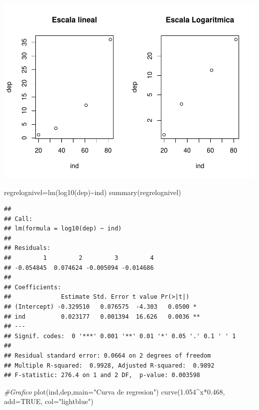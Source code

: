\documentclass[
]{article}
\newenvironment{Shaded}{\begin{snugshade}}{\end{snugshade}}
\newcommand{\AttributeTok}[1]{\textcolor[rgb]{0.77,0.63,0.00}{#1}}
\newcommand{\CommentTok}[1]{\textcolor[rgb]{0.56,0.35,0.01}{\textit{#1}}}
\newcommand{\ConstantTok}[1]{\textcolor[rgb]{0.00,0.00,0.00}{#1}}
\newcommand{\FloatTok}[1]{\textcolor[rgb]{0.00,0.00,0.81}{#1}}
\newcommand{\FunctionTok}[1]{\textcolor[rgb]{0.00,0.00,0.00}{#1}}
\newcommand{\NormalTok}[1]{#1}
\newcommand{\OtherTok}[1]{\textcolor[rgb]{0.56,0.35,0.01}{#1}}
\newcommand{\SpecialCharTok}[1]{\textcolor[rgb]{0.00,0.00,0.00}{#1}}
\newcommand{\StringTok}[1]{\textcolor[rgb]{0.31,0.60,0.02}{#1}}
\begin{document}
\includegraphics{Teoria4_files/figure-latex/Graficos en dos escalas-1.pdf}

\begin{Shaded}
\begin{Highlighting}[]
\NormalTok{regrelognivel}\OtherTok{=}\FunctionTok{lm}\NormalTok{(}\FunctionTok{log10}\NormalTok{(dep)}\SpecialCharTok{\textasciitilde{}}\NormalTok{ind)}
\FunctionTok{summary}\NormalTok{(regrelognivel)}
\end{Highlighting}
\end{Shaded}

\begin{verbatim}
## 
## Call:
## lm(formula = log10(dep) ~ ind)
## 
## Residuals:
##         1         2         3         4 
## -0.054845  0.074624 -0.005094 -0.014686 
## 
## Coefficients:
##              Estimate Std. Error t value Pr(>|t|)   
## (Intercept) -0.329510   0.076575  -4.303   0.0500 * 
## ind          0.023177   0.001394  16.626   0.0036 **
## ---
## Signif. codes:  0 '***' 0.001 '**' 0.01 '*' 0.05 '.' 0.1 ' ' 1
## 
## Residual standard error: 0.0664 on 2 degrees of freedom
## Multiple R-squared:  0.9928, Adjusted R-squared:  0.9892 
## F-statistic: 276.4 on 1 and 2 DF,  p-value: 0.003598
\end{verbatim}

\begin{Shaded}
\begin{Highlighting}[]
\CommentTok{\#Grafico}
\FunctionTok{plot}\NormalTok{(ind,dep,}\AttributeTok{main=}\StringTok{"Curva de regresion"}\NormalTok{)}
\FunctionTok{curve}\NormalTok{(}\FloatTok{1.054}\SpecialCharTok{\^{}}\NormalTok{x}\SpecialCharTok{*}\FloatTok{0.468}\NormalTok{, }\AttributeTok{add=}\ConstantTok{TRUE}\NormalTok{, }\AttributeTok{col=}\StringTok{"lightblue"}\NormalTok{)}
\end{Highlighting}
\end{Shaded}
\end{document}
